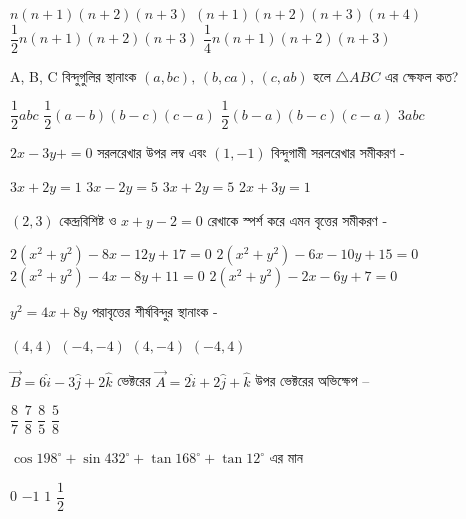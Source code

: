\documentclass[addpoints]{exam}
\begin{document}
\begin{questions}
\begin{oneparchoices}
\choice $ n(n+1)(n+2)(n+3) $
\choice $ (n+1)(n+2)(n+3)(n+4) $
\choice $ \dfrac{1}{2} n(n+1)(n+2)(n+3) $
\choice $ \dfrac{1}{4} n(n+1)(n+2)(n+3) $
\end{oneparchoices}

\question  A, B, C বিন্দুগুলির স্থানাংক $ (a, bc),\,(b,ca),\,(c,ab) $ হলে $ \triangle ABC $ এর ক্ষেফল কত?

\begin{oneparchoices}
\choice $ \dfrac{1}{2}abc $
\choice $ \dfrac{1}{2}(a-b)(b-c)(c-a) $
\choice $ \dfrac{1}{2}(b-a)(b-c)(c-a) $
\choice $ 3abc $
\end{oneparchoices}

 \question  $ 2x-3y+=0 $ সরলরেখার উপর লম্ব এবং $ (1,-1) $ বিন্দুগামী সরলরেখার সমীকরণ -

\begin{oneparchoices}
\choice $ 3x+2y=1 $
\choice $ 3x-2y=5 $
\choice $ 3x+2y=5 $
\choice $ 2x+3y = 1 $
\end{oneparchoices}

\question  $ (2,3) $ কেন্দ্রবিশিষ্ট ও $ x+y-2=0 $ রেখাকে স্পর্শ করে এমন বৃত্তের সমীকরণ -

\begin{oneparchoices}
\choice  $ 2(x^{2}+y^{2})-8x-12y+17=0 $
\choice  $ 2(x^{2}+y^{2})-6x-10y+15=0 $\\
\choice  $ 2(x^{2}+y^{2})-4x-8y+11=0 $
\choice  $ 2(x^{2}+y^{2})-2x-6y+7=0 $
\end{oneparchoices}

\question $ y^{2}=4x+8y $ পরাবৃত্তের শীর্ষবিন্দুর স্থানাংক -

\begin{oneparchoices}
\choice $ (4,4) $
\choice $ (-4,-4) $
\choice $ (4,-4) $
\choice  $ (-4,4) $
\end{oneparchoices}

\question $ \vec{B} = 6\hat{i}-3\hat{j}+2\hat{k} $ ভেক্টরের  $ \vec{A} =2\hat{i}+2\hat{j}+\hat{k} $ উপর ভেক্টরের অভিক্ষেপ –

\begin{oneparchoices}
\choice $ \dfrac{8}{7} $
\choice $ \dfrac{7}{8} $
\choice $ \dfrac{8}{5} $
\choice  $\dfrac{5}{8} $
\end{oneparchoices}

\question $ \cos 198^{\circ} +\sin 432^{\circ} + \tan 168^{\circ} + \tan 12^{\circ}$ এর মান

\begin{oneparchoices}
\choice $ 0 $
\choice $ -1 $
\choice $ 1 $
\choice $ \dfrac{1}{2} $
\end{oneparchoices}


\end{questions}
\end{document}
